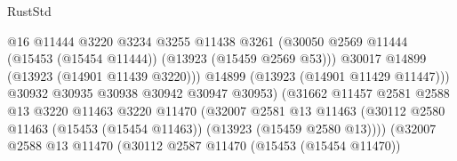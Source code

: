 \begin{lexlean}{RustStd}
\begin{coremodule}
                                              @16
                                              @11444
                                              @3220
                                              @3234
                                              @3255
                                              @11438
                                              @3261
                                              (@30050
                                                @2569
                                                @11444
                                                (@15453 (@15454 @11444))
                                                (@13923 (@15459 @2569 @53)))
                                              @30017
                                              @14899
                                              (@13923 (@14901 @11439 @3220)))
                                            @14899
                                            (@13923 (@14901 @11429 @11447)))
                                          @30932
                                          @30935
                                          @30938
                                          @30942
                                          @30947
                                          @30953)
                                        (@31662
                                          @11457
                                          @2581
                                          @2588
                                          @13
                                          @3220
                                          @11463
                                          @3220
                                          @11470
                                          (@32007
                                            @2581
                                            @13
                                            @11463
                                            (@30112
                                              @2580
                                              @11463
                                              (@15453 (@15454 @11463))
                                              (@13923 (@15459 @2580 @13))))
                                          (@32007
                                            @2588
                                            @13
                                            @11470
                                            (@30112
                                              @2587
                                              @11470
                                              (@15453 (@15454 @11470))

\end{coremodule}
\end{lexlean}
